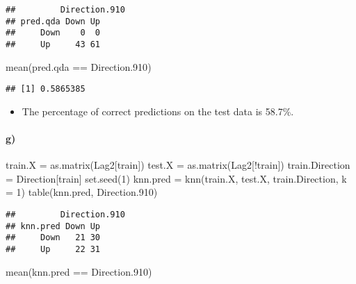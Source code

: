 \documentclass[
]{article}
\newenvironment{Shaded}{\begin{snugshade}}{\end{snugshade}}
\newcommand{\AttributeTok}[1]{\textcolor[rgb]{0.77,0.63,0.00}{#1}}
\newcommand{\DecValTok}[1]{\textcolor[rgb]{0.00,0.00,0.81}{#1}}
\newcommand{\FloatTok}[1]{\textcolor[rgb]{0.00,0.00,0.81}{#1}}
\newcommand{\FunctionTok}[1]{\textcolor[rgb]{0.00,0.00,0.00}{#1}}
\newcommand{\NormalTok}[1]{#1}
\newcommand{\OtherTok}[1]{\textcolor[rgb]{0.56,0.35,0.01}{#1}}
\newcommand{\SpecialCharTok}[1]{\textcolor[rgb]{0.00,0.00,0.00}{#1}}
\providecommand{\tightlist}{%
  \setlength{\itemsep}{0pt}\setlength{\parskip}{0pt}}
\begin{document}
\begin{verbatim}
##         Direction.910
## pred.qda Down Up
##     Down    0  0
##     Up     43 61
\end{verbatim}

\begin{Shaded}
\begin{Highlighting}[]
\FunctionTok{mean}\NormalTok{(pred.qda }\SpecialCharTok{==}\NormalTok{ Direction}\FloatTok{.910}\NormalTok{)}
\end{Highlighting}
\end{Shaded}

\begin{verbatim}
## [1] 0.5865385
\end{verbatim}

\begin{itemize}
\tightlist
\item
  The percentage of correct predictions on the test data is 58.7\%.
\end{itemize}

\hypertarget{g}{%
\paragraph{g)}\label{g}}

\begin{Shaded}
\begin{Highlighting}[]
\NormalTok{train.X }\OtherTok{=} \FunctionTok{as.matrix}\NormalTok{(Lag2[train])}
\NormalTok{test.X }\OtherTok{=} \FunctionTok{as.matrix}\NormalTok{(Lag2[}\SpecialCharTok{!}\NormalTok{train])}
\NormalTok{train.Direction }\OtherTok{=}\NormalTok{ Direction[train]}
\FunctionTok{set.seed}\NormalTok{(}\DecValTok{1}\NormalTok{)}
\NormalTok{knn.pred }\OtherTok{=} \FunctionTok{knn}\NormalTok{(train.X, test.X, train.Direction, }\AttributeTok{k =} \DecValTok{1}\NormalTok{)}
\FunctionTok{table}\NormalTok{(knn.pred, Direction}\FloatTok{.910}\NormalTok{)}
\end{Highlighting}
\end{Shaded}

\begin{verbatim}
##         Direction.910
## knn.pred Down Up
##     Down   21 30
##     Up     22 31
\end{verbatim}

\begin{Shaded}
\begin{Highlighting}[]
\FunctionTok{mean}\NormalTok{(knn.pred }\SpecialCharTok{==}\NormalTok{ Direction}\FloatTok{.910}\NormalTok{)}
\end{Highlighting}
\end{Shaded}
\end{document}
